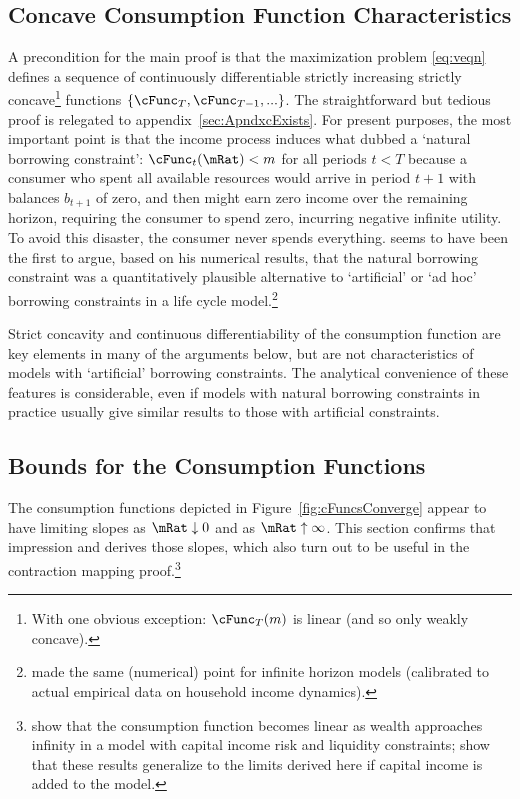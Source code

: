 \documentclass[BufferStockTheory]{subfiles}
\begin{document}
\hypertarget{Concave-Consumption-Function-Characteristics}{}
\subsection{Concave Consumption Function Characteristics}\label{sec:cExists}

A precondition for the main proof is that the maximization problem \eqref{eq:veqn} defines a sequence of continuously differentiable strictly increasing strictly concave\footnote{With one obvious exception: $\cFunc_{T}(m)$ is linear (and so only weakly concave).} functions $\{\cFunc_{T},\cFunc_{T-1},...\}$.  The straightforward but tedious proof is relegated to appendix~\ref{sec:ApndxcExists}.  For present purposes, the most important point is that the income process induces what \cite{aiyagari:ge} dubbed a `natural borrowing constraint':  $\cFunc_{t}(\mRat) < m$ for all periods $t < T$ because a consumer who spent all available resources would arrive in period $t+1$ with balances $b_{t+1}$ of zero, and then might earn zero income over the remaining horizon, requiring the consumer to spend zero, incurring negative infinite utility.  To avoid this disaster, the consumer never spends everything.  \cite{zeldesStochastic} seems to have been the first to argue, based on his numerical results, that the natural borrowing constraint was a quantitatively plausible alternative to `artificial' or `ad hoc' borrowing constraints in a life cycle model.\footnote{\cite{carrollBrookings} made the same (numerical) point for infinite horizon models (calibrated to actual empirical data on household income dynamics).}

Strict concavity and continuous differentiability of the consumption function are key elements in many of the arguments below, but are not characteristics of models with `artificial' borrowing constraints.  The analytical convenience of these features is considerable, even if models with natural borrowing constraints in practice usually give similar results to those with artificial constraints.

\hypertarget{Bounds-for-the-Consumption-Functions}{}
\subsection{Bounds for the Consumption Functions}

The consumption functions depicted in Figure~\ref{fig:cFuncsConverge} appear
to have limiting slopes as $\mRat \downarrow 0$ and as $\mRat \uparrow
\infty$.  This section confirms that impression and derives those
slopes, which also turn out to be useful in the contraction
mapping proof.\footnote{\cite{benhabibWealth} show that the consumption function
  becomes linear as wealth approaches infinity in a model with capital income risk and liquidity
  constraints; \cite{maTodaRich} show that these results generalize to the limits derived here if capital income is added to the model.}
\end{document}
